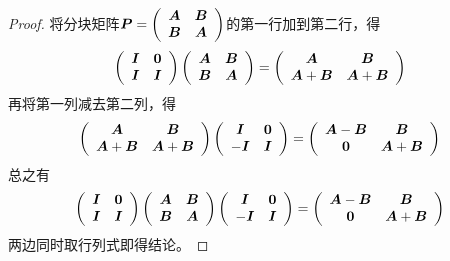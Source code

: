 \begin{proof}

  将分块矩阵$
  \boldsymbol{P} = 
  \left(
    \begin{array}{cc}
      \boldsymbol{A}&\boldsymbol{B}\\
      \boldsymbol{B}&\boldsymbol{A}
    \end{array}
  \right)$的第一行加到第二行，得
  $$
  \left(
    \begin{array}{cc}
      \MI & \M0\\
      \MI & \MI
    \end{array}
  \right) \left(
    \begin{array}{cc}
      \MA&\MB\\
      \MB&\MA
    \end{array}
  \right) = \left(
    \begin{array}{cc}
      \MA&\MB\\
      \MA+\MB&\MA+\MB
    \end{array}
  \right)
  $$
  再将第一列减去第二列，得
  $$
  \left(
    \begin{array}{cc}
      \MA&\MB\\
      \MA+\MB&\MA+\MB
    \end{array}
  \right) \left(
    \begin{array}{cc}
      \MI&\M0\\
      -\MI&\MI
    \end{array}
  \right) = \left(
    \begin{array}{cc}
      \MA-\MB & \MB\\
      \M0 & \MA+\MB
    \end{array}
  \right)
  $$
  总之有
  $$
  \left(
    \begin{array}{cc}
      \MI & \M0\\
      \MI & \MI
    \end{array}
  \right) \left(
    \begin{array}{cc}
      \MA&\MB\\
      \MB&\MA
    \end{array}
  \right) 
  \left(
    \begin{array}{cc}
      \MI&\M0\\
      -\MI&\MI
    \end{array}
  \right) = \left(
    \begin{array}{cc}
      \MA-\MB & \MB\\
      \M0 & \MA+\MB
    \end{array}
  \right)
  $$
  两边同时取行列式即得结论。
\end{proof}


